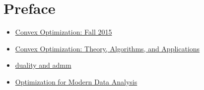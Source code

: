 \chapter{Preface}

\begin{itemize}
    \item \href{https://www.stat.cmu.edu/~ryantibs/convexopt-F15/}{Convex Optimization: Fall 2015}
    \item \href{https://sites.gatech.edu/ece-6270-fall-2022/}{Convex Optimization: Theory, Algorithms, and Applications}
    \item \href{https://web.eecs.umich.edu/~fessler/course/598/l/n-07-dual.pdf}{duality and admm}
    \item \href{https://people.eecs.berkeley.edu/~brecht/opt4ml_book/}{Optimization for Modern Data Analysis}
\end{itemize}